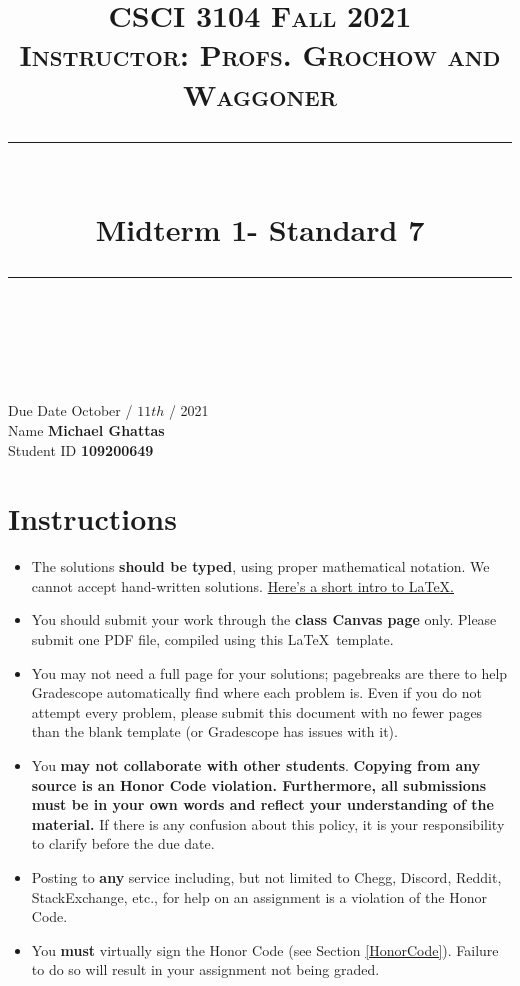 \documentclass[11pt]{article}
\title{
\normalfont \normalsize 
\textsc{CSCI 3104 Fall 2021 \\ 
Instructor: Profs. Grochow and Waggoner} \\
[10pt] 
\rule{\linewidth}{0.5pt} \\[6pt] 
\huge Midterm 1- Standard 7 \\
\rule{\linewidth}{2pt}  \\[10pt]
}
\date{}
\theoremstyle{definition}
\theoremstyle{definition}
\theoremstyle{definition}
\begin{document}

\maketitle


\noindent
Due Date \dotfill October / $11{th}$ / 2021 \\
Name \dotfill \textbf{Michael Ghattas} \\
Student ID \dotfill \textbf{109200649} \\


\tableofcontents

\section{Instructions}
 \begin{itemize}
	\item The solutions \textbf{should be typed}, using proper mathematical notation. We cannot accept hand-written solutions. \href{http://ece.uprm.edu/~caceros/latex/introduction.pdf}{Here's a short intro to \LaTeX.}
	\item You should submit your work through the \textbf{class Canvas page} only. Please submit one PDF file, compiled using this \LaTeX \ template.
	\item You may not need a full page for your solutions; pagebreaks are there to help Gradescope automatically find where each problem is. Even if you do not attempt every problem, please submit this document with no fewer pages than the blank template (or Gradescope has issues with it).

	\item You \textbf{may not collaborate with other students}. \textbf{Copying from any source is an Honor Code violation. Furthermore, all submissions must be in your own words and reflect your understanding of the material.} If there is any confusion about this policy, it is your responsibility to clarify before the due date. 

	\item Posting to \textbf{any} service including, but not limited to Chegg, Discord, Reddit, StackExchange, etc., for help on an assignment is a violation of the Honor Code.

	\item You \textbf{must} virtually sign the Honor Code (see Section \ref{HonorCode}). Failure to do so will result in your assignment not being graded.
\end{itemize}
\end{document}
